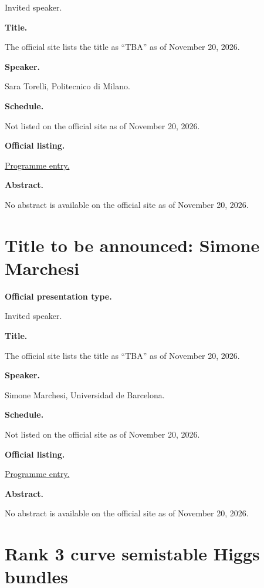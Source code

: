 Invited speaker.

\medskip\noindent
{\bf Title.}

The official site lists the title as
``TBA'' as of November 20, 2026.

\medskip\noindent
{\bf Speaker.}

Sara Torelli, Politecnico di Milano.

\medskip\noindent
{\bf Schedule.}

Not listed on the official site as of
November 20, 2026.

\medskip\noindent
{\bf Official listing.}

\href{%
https://sites.google.com/view/%
geoalgcompluff/legal/%
legal-2027-resumos#h.59gubrdmgdxn%
}{Programme entry.}

\medskip\noindent
{\bf Abstract.}

No abstract is available on the
official site as of November 20, 2026.

\section{Title to be announced: Simone
Marchesi}
\label{section-tba-marchesi}

\medskip\noindent
{\bf Official presentation type.}

Invited speaker.

\medskip\noindent
{\bf Title.}

The official site lists the title as
``TBA'' as of November 20, 2026.

\medskip\noindent
{\bf Speaker.}

Simone Marchesi, Universidad de Barcelona.

\medskip\noindent
{\bf Schedule.}

Not listed on the official site as of
November 20, 2026.

\medskip\noindent
{\bf Official listing.}

\href{%
https://sites.google.com/view/%
geoalgcompluff/legal/%
legal-2027-resumos#h.59gubrdmgdxn%
}{Programme entry.}

\medskip\noindent
{\bf Abstract.}

No abstract is available on the
official site as of November 20, 2026.

\section{Rank 3 curve semistable Higgs
bundles}
\label{section-rank-3-curve-semistable-higgs}

